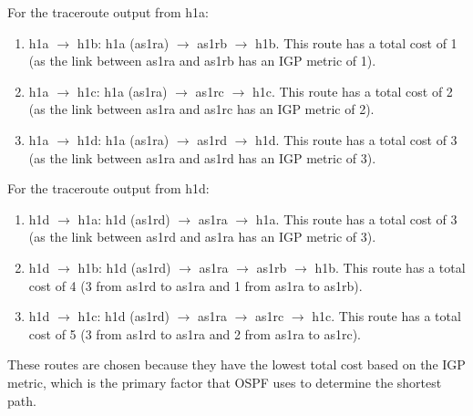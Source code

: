 For the traceroute output from h1a:
\begin{enumerate}[label=\arabic*.]
    \item h1a $\to$ h1b: h1a (as1ra) $\to$ as1rb $\to$ h1b. This route has a total cost of 1 (as the link between as1ra and as1rb has an IGP metric of 1).
    \item h1a $\to$ h1c: h1a (as1ra) $\to$ as1rc $\to$ h1c. This route has a total cost of 2 (as the link between as1ra and as1rc has an IGP metric of 2).
    \item h1a $\to$ h1d: h1a (as1ra) $\to$ as1rd $\to$ h1d. This route has a total cost of 3 (as the link between as1ra and as1rd has an IGP metric of 3).
\end{enumerate}

For the traceroute output from h1d:
\begin{enumerate}[label=\arabic*.]
    \item h1d $\to$ h1a: h1d (as1rd) $\to$ as1ra $\to$ h1a. This route has a total cost of 3 (as the link between as1rd and as1ra has an IGP metric of 3).
    \item h1d $\to$ h1b: h1d (as1rd) $\to$ as1ra $\to$ as1rb $\to$ h1b. This route has a total cost of 4 (3 from as1rd to as1ra and 1 from as1ra to as1rb).
    \item h1d $\to$ h1c: h1d (as1rd) $\to$ as1ra $\to$ as1rc $\to$ h1c. This route has a total cost of 5 (3 from as1rd to as1ra and 2 from as1ra to as1rc).
\end{enumerate}

These routes are chosen because they have the lowest total cost based on the IGP metric, which is the primary factor that OSPF uses to determine the shortest path.